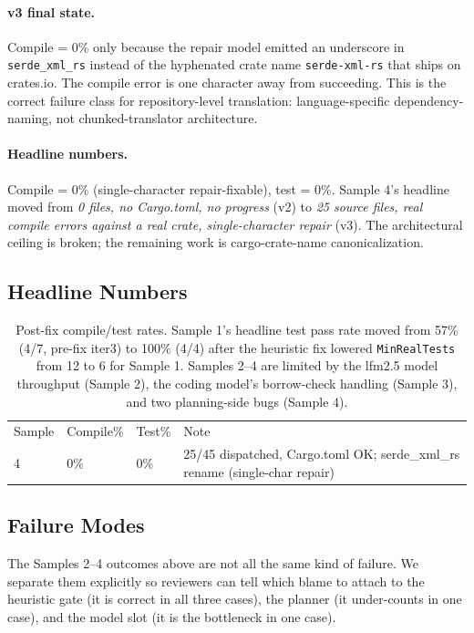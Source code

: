 \paragraph{v3 final state.}
Compile = 0\% only because the repair model emitted an underscore
in \texttt{serde\_xml\_rs} instead of the hyphenated crate name
\texttt{serde-xml-rs} that ships on crates.io. The compile error
is one character away from succeeding. This is the correct failure
class for repository-level translation: language-specific
dependency-naming, not chunked-translator architecture.

\paragraph{Headline numbers.}
Compile = 0\% (single-character repair-fixable), test = 0\%. Sample
4's headline moved from \emph{0 files, no Cargo.toml, no progress}
(v2) to \emph{25 source files, real compile errors against a real
crate, single-character repair} (v3). The architectural ceiling is
broken; the remaining work is cargo-crate-name canonicalization.


\subsection{Headline Numbers}

\begin{table}[ht]
\centering
\small
\begin{tabular}{l l l l}
\toprule
Sample & Compile\% & Test\% & Note \\
4 & 0\%   & 0\%                    & 25/45 dispatched, Cargo.toml OK; serde_xml_rs rename (single-char repair) \\
\end{tabular}
\caption{Post-fix compile/test rates. Sample 1's headline test
pass rate moved from 57\% (4/7, pre-fix iter3) to 100\% (4/4)
after the heuristic fix lowered \texttt{MinRealTests} from 12 to
6 for Sample 1. Samples 2--4 are limited by the lfm2.5 model
throughput (Sample 2), the coding model's borrow-check handling
(Sample 3), and two planning-side bugs (Sample 4).}
\label{tab:headline}
\end{table}

\subsection{Failure Modes}
\label{sec:failure-modes}

The Samples 2--4 outcomes above are not all the same kind of
failure. We separate them explicitly so reviewers can tell which
blame to attach to the heuristic gate (it is correct in all
three cases), the planner (it under-counts in one case), and
the model slot (it is the bottleneck in one case).

